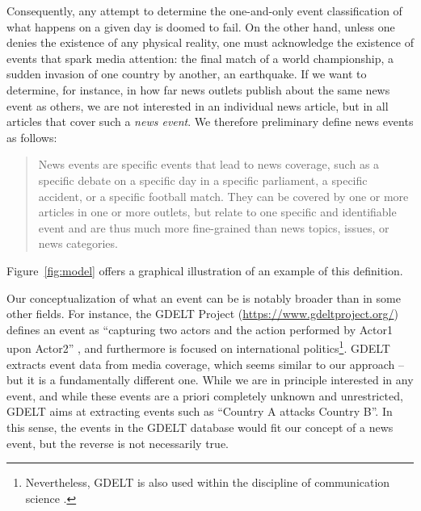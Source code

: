 \documentclass[a4paper,man,natbib,floatsintext,mask]{apa6}
\begin{document}
Consequently, any attempt to determine the one-and-only event classification of what happens on a given day is doomed to fail. On the other hand, unless one denies the existence of any physical reality, one must acknowledge the existence of events that spark media attention: the final match of a world championship, a sudden invasion of one country by another, an earthquake. 
If we want to determine, for instance, in how far news outlets publish about the same news event as others, we are not interested in an individual news article, but in all articles that cover such a \emph{news event}. We therefore preliminary define news events as follows: 

\begin{quote}
News events are specific events that lead to news coverage, such as a specific debate on a specific day in a specific parliament, a specific accident, or a specific football match. They can be covered by one or more articles in one or more outlets, but relate to one specific and identifiable event and are thus much more fine-grained than news topics, issues, or news categories.
\end{quote}
Figure~\ref{fig:model} offers a graphical illustration of an example of this definition. 



\clearpage


Our conceptualization of what an event can be is notably broader than in some other fields. For instance, the GDELT Project (\url{https://www.gdeltproject.org/}) defines an event as ``capturing two actors and the action performed by Actor1 upon Actor2'' \citep[p.~41]{GDELT}, and furthermore is focused on international politics\footnote{Nevertheless, GDELT is also used within the discipline of communication science \citep[see][]{hopp2019}.}. GDELT extracts event data from media coverage, which seems similar to our approach -- but it is a fundamentally different one. While we are in principle interested in any event, and while these events are a priori completely unknown and unrestricted, GDELT aims at extracting events such as  ``Country A attacks Country B''. In this sense, the events in the GDELT database would fit our concept of a news event, but the reverse is not necessarily true.
\end{document}
